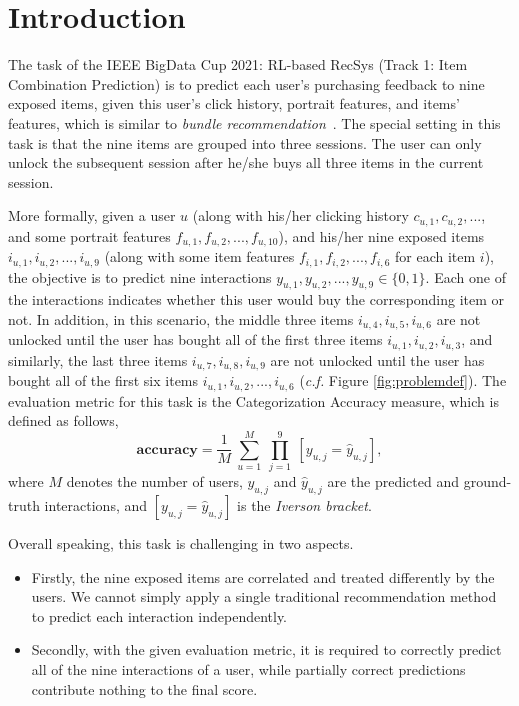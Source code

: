 

\section{Introduction} \label{sec:intro}



The task of the IEEE BigData Cup 2021: RL-based RecSys (Track 1: Item Combination Prediction) \cite{2021RL4RS, kaggle} is to predict each user's purchasing feedback to nine exposed items, given this user's click history, portrait features, and items' features, which is similar to \textit{bundle recommendation}~\cite{chang2020bundle}.
The special setting in this task is that the nine items are grouped into three sessions. 
The user can only unlock the subsequent session after he/she buys all three items in the current session.

More formally, given a user $u$ (along with his/her clicking history $c_{u,1}, c_{u,2}, ...$, and some portrait features $f_{u,1}, f_{u,2}, ..., f_{u,10}$), and his/her nine exposed items $i_{u,1}, i_{u,2}, ..., i_{u,9}$ (along with some item features $f_{i,1}, f_{i,2}, ..., f_{i,6}$ for each item $i$), 
the objective is to predict nine interactions $y_{u,1}, y_{u,2}, ..., y_{u,9} \in \{0,1\}$.
Each one of the interactions indicates whether this user would buy the corresponding item or not. 
In addition, in this scenario, the middle three items $i_{u,4}, i_{u,5}, i_{u,6}$ are not unlocked until the user has bought all of the first three items $i_{u,1}, i_{u,2}, i_{u,3}$, and similarly, the last three items $i_{u,7}, i_{u,8}, i_{u,9}$ are not unlocked until the user has bought all of the first six items $i_{u,1}, i_{u,2}, ..., i_{u,6}$ (\textit{c.f.} Figure \ref{fig:problemdef}). 
The evaluation metric for this task is the Categorization Accuracy measure, which is defined as follows,
\begin{equation}
    \textbf{accuracy} = \frac{1}{M} 
    ~\overset{M}{\underset{u=1}{\sum}}  ~\overset{9}{\underset{j=1}{\prod}} 
    ~[y_{u,j} = \hat{y}_{u,j}],
\end{equation}
where $M$ denotes the number of users, $y_{u,j}$ and $\hat{y}_{u,j}$ are the predicted and ground-truth interactions, and $[y_{u,j} = \hat{y}_{u,j}]$ is the \textit{Iverson bracket}.

Overall speaking, this task is challenging in two aspects.
\begin{itemize}
    \item Firstly, the nine exposed items are correlated and treated differently by the users. We cannot simply apply a single traditional recommendation method to predict each interaction independently.
    \item Secondly, with the given evaluation metric, it is required to correctly predict all of the nine interactions of a user, while partially correct predictions contribute nothing to the final score.
\end{itemize}
%

